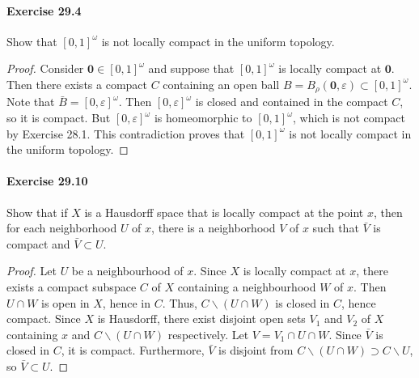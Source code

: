 \documentclass{article}
\begin{document}
\paragraph{Exercise 29.4} Show that $[0, 1]^\omega$ is not locally compact in the uniform topology.
\begin{proof}
    Consider $\mathbf{0} \in[0,1]^\omega$ and suppose that $[0,1]^\omega$ is locally compact at $\mathbf{0}$. Then there exists a compact $C$ containing an open ball $B=B_\rho(\mathbf{0}, \varepsilon) \subset[0,1]^\omega$. Note that $\bar{B}=[0, \varepsilon]^\omega$. Then $[0, \varepsilon]^\omega$ is closed and contained in the compact $C$, so it is compact. But $[0, \varepsilon]^\omega$ is homeomorphic to $[0,1]^\omega$, which is not compact by Exercise 28.1. This contradiction proves that $[0,1]^\omega$ is not locally compact in the uniform topology.
\end{proof}



\paragraph{Exercise 29.10} Show that if $X$ is a Hausdorff space that is locally compact at the point $x$, then for each neighborhood $U$ of $x$, there is a neighborhood $V$ of $x$ such that $\bar{V}$ is compact and $\bar{V} \subset U$.
\begin{proof}
    Let $U$ be a neighbourhood of $x$. Since $X$ is locally compact at $x$, there exists a compact subspace $C$ of $X$ containing a neighbourhood $W$ of $x$. Then $U \cap W$ is open in $X$, hence in $C$. Thus, $C \backslash(U \cap W)$ is closed in $C$, hence compact. Since $X$ is Hausdorff, there exist disjoint open sets $V_1$ and $V_2$ of $X$ containing $x$ and $C \backslash(U \cap W)$ respectively. Let $V=V_1 \cap U \cap W$. Since $\bar{V}$ is closed in $C$, it is compact. Furthermore, $\bar{V}$ is disjoint from $C \backslash(U \cap W) \supset C \backslash U$, so $\bar{V} \subset U$.
\end{proof}
\end{document}
